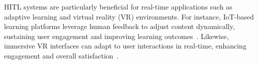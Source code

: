 HITL systems are particularly beneficial for real-time applications such as adaptive learning and virtual reality (VR) environments. For instance, IoT-based learning platforms leverage human feedback to adjust content dynamically, sustaining user engagement and improving learning outcomes~\cite{taherisadr2023erudite}. Likewise, immersive VR interfaces can adapt to user interactions in real-time, enhancing engagement and overall satisfaction~\cite{yigitbas2021enhancing}.